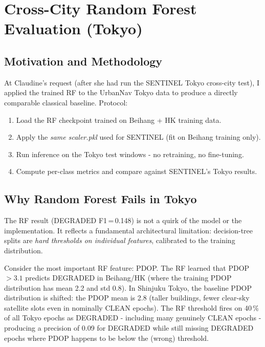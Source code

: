 \documentclass[12pt,a4paper]{article}
\begin{document}
\section{Cross-City Random Forest Evaluation (Tokyo)}

\subsection{Motivation and Methodology}

At Claudine's request (after she had run the SENTINEL Tokyo cross-city test),
I applied the trained RF to the UrbanNav Tokyo data to produce a directly comparable
classical baseline.
Protocol:
\begin{enumerate}
  \item Load the RF checkpoint trained on Beihang + HK training data.
  \item Apply the \emph{same scaler.pkl} used for SENTINEL (fit on Beihang training only).
  \item Run inference on the Tokyo test windows - no retraining, no fine-tuning.
  \item Compute per-class metrics and compare against SENTINEL's Tokyo results.
\end{enumerate}

\subsection{Why Random Forest Fails in Tokyo}

The RF result (DEGRADED F1\,=\,0.148) is not a quirk of the model or the implementation.
It reflects a fundamental architectural limitation: decision-tree splits are
\emph{hard thresholds on individual features}, calibrated to the training distribution.

Consider the most important RF feature: PDOP.
The RF learned that PDOP $> 3.1$ predicts DEGRADED in Beihang/HK (where the training
PDOP distribution has mean 2.2 and std 0.8).
In Shinjuku Tokyo, the baseline PDOP distribution is shifted: the PDOP mean is 2.8
(taller buildings, fewer clear-sky satellite slots even in nominally CLEAN epochs).
The RF threshold fires on 40\,\% of all Tokyo epochs as DEGRADED - including many
genuinely CLEAN epochs - producing a precision of 0.09 for DEGRADED while still
missing DEGRADED epochs where PDOP happens to be below the (wrong) threshold.
\end{document}
